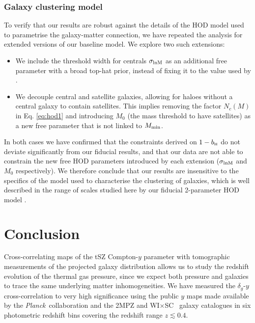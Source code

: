\documentclass[useAMS,usenatbib]{mn2e}
\newcommand{\wisc}{WI$\times$SC}
\def\bH{b_{\scriptscriptstyle\rm H}}
\def\planck{{\it Planck\/}}
\begin{document}
    \subsubsection{Galaxy clustering model}\label{sssec:results.syst.gc}
      To verify that our results are robust against the details of the HOD model used to parametrise the galaxy-matter connection, we have repeated the analysis for extended versions of our baseline model. We explore two such extensions:
      \begin{itemize}
        \item We include the threshold width for centrals $\sigma_{\rm lnM}$ as an additional free parameter with a broad top-hat prior, instead of fixing it to the value used by \cite{2018MNRAS.473.4318A}.
        \item We decouple central and satellite galaxies, allowing for haloes without a central galaxy to contain satellites. This implies removing the factor $N_c(M)$ in Eq. \ref{eq:hod1} and introducing $M_0$ (the mass threshold to have satellites) as a new free parameter that is not linked to $M_{\rm min}$.
      \end{itemize}
      In both cases we have confirmed that the constraints derived on $1-\bH$ do not deviate significantly from our fiducial results, and that our data are not able to constrain the new free HOD parameters introduced by each extension ($\sigma_{\rm lnM}$ and $M_0$ respectively). We therefore conclude that our results are insensitive to the specifics of the model used to characterise the clustering of galaxies, which is well described in the range of scales studied here by our fiducial 2-parameter HOD model .

      
\section{Conclusion}\label{sec:conclusion}
  Cross-correlating maps of the tSZ Compton-$y$ parameter with tomographic measurements of the projected galaxy distribution allows us to study the redshift evolution of the thermal gas pressure, since we expect both pressure and galaxies to trace the same underlying matter inhomogeneities. We have measured the $\delta_g$-$y$ cross-correlation to very high significance using the public $y$ maps made available by the \planck\ collaboration \citep{2016A&A...594A..22P} and the 2MPZ and \wisc~ galaxy catalogues \citep{2014ApJS..210....9B,2016ApJS..225....5B} in six photometric redshift bins covering the redshift range $z\lesssim0.4$.
  
\end{document}
